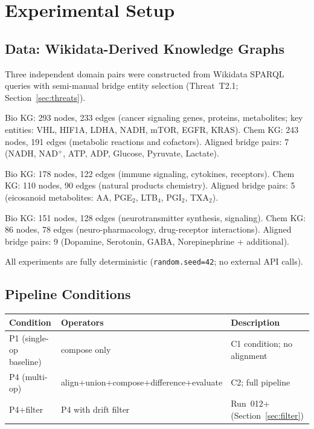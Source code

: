 \section{Experimental Setup}
\label{sec:setup}

\subsection{Data: Wikidata-Derived Knowledge Graphs}

Three independent domain pairs were constructed from Wikidata SPARQL queries
with semi-manual bridge entity selection (Threat~T2.1; Section~\ref{sec:threats}).

\begin{description}[leftmargin=0pt]
\item[Subset~A --- Cancer Signaling / Metabolic Chemistry]
Bio KG: 293 nodes, 233 edges (cancer signaling genes, proteins, metabolites;
key entities: VHL, HIF1A, LDHA, NADH, mTOR, EGFR, KRAS).
Chem KG: 243 nodes, 191 edges (metabolic reactions and cofactors).
Aligned bridge pairs: 7 (NADH, NAD$^+$, ATP, ADP, Glucose, Pyruvate, Lactate).

\item[Subset~B --- Immunology / Natural Products]
Bio KG: 178 nodes, 122 edges (immune signaling, cytokines, receptors).
Chem KG: 110 nodes, 90 edges (natural products chemistry).
Aligned bridge pairs: 5 (eicosanoid metabolites: AA, PGE$_2$, LTB$_4$, PGI$_2$, TXA$_2$).

\item[Subset~C --- Neuroscience / Neuro-pharmacology]
Bio KG: 151 nodes, 128 edges (neurotransmitter synthesis, signaling).
Chem KG: 86 nodes, 78 edges (neuro-pharmacology, drug-receptor interactions).
Aligned bridge pairs: 9 (Dopamine, Serotonin, GABA, Norepinephrine + additional).
\end{description}

All experiments are fully deterministic (\texttt{random.seed=42}; no external API calls).

\subsection{Pipeline Conditions}

\begin{center}
\begin{tabular}{lll}
\toprule
Condition & Operators & Description \\
\midrule
P1 (single-op baseline) & compose only        & C1 condition; no alignment \\
P4 (multi-op)           & align+union+compose+difference+evaluate & C2; full pipeline \\
P4+filter               & P4 with drift filter & Run~012+ (Section~\ref{sec:filter}) \\
\bottomrule
\end{tabular}
\end{center}

